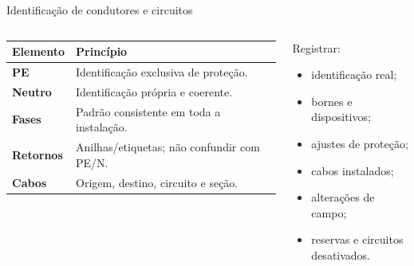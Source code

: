\begin{frame}{Identificação de condutores e circuitos}
\small
\begin{columns}[T,onlytextwidth]
\begin{tabularx}{\textwidth}{>{\bfseries}p{2.1cm}X}
\toprule
Elemento & Princípio \\
\midrule
PE & Identificação exclusiva de proteção. \\
Neutro & Identificação própria e coerente. \\
Fases & Padrão consistente em toda a instalação. \\
Retornos & Anilhas/etiquetas; não confundir com PE/N. \\
Cabos & Origem, destino, circuito e seção. \\
\bottomrule
\end{tabularx}
\begin{caixaProjeto}[title=As built útil]
Registrar:
\begin{itemize}
\item identificação real;
\item bornes e dispositivos;
\item ajustes de proteção;
\item cabos instalados;
\item alterações de campo;
\item reservas e circuitos desativados.
\end{itemize}
\end{caixaProjeto}
\end{columns}
\end{frame}

